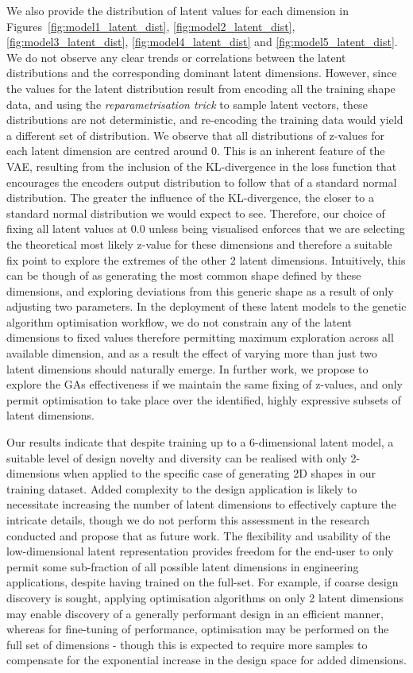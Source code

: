 \documentclass{article}
\begin{document}
We also provide the distribution of latent values for each dimension in Figures~\ref{fig:model1_latent_dist}, \ref{fig:model2_latent_dist}, \ref{fig:model3_latent_dist}, \ref{fig:model4_latent_dist} and \ref{fig:model5_latent_dist}. We do not observe any clear trends or correlations between the latent distributions and the corresponding dominant latent dimensions. However, since the values for the latent distribution result from encoding all the training shape data, and using the \textit{reparametrisation trick} to sample latent vectors, these distributions are not deterministic, and re-encoding the training data would yield a different set of distribution. We observe that all distributions of z-values for each latent dimension are centred around 0. This is an inherent feature of the VAE, resulting from the inclusion of the KL-divergence in the loss function that encourages the encoders output distribution to follow that of a standard normal distribution. The greater the influence of the KL-divergence, the closer to a standard normal distribution we would expect to see. Therefore, our choice of fixing all latent values at 0.0 unless being visualised enforces that we are selecting the theoretical most likely z-value for these dimensions and therefore a suitable fix point to explore the extremes of the other 2 latent dimensions. Intuitively, this can be though of as generating the most common shape defined by these dimensions, and exploring deviations from this generic shape as a result of only adjusting two parameters. In the deployment of these latent models to the genetic algorithm optimisation workflow, we do not constrain any of the latent dimensions to fixed values therefore permitting maximum exploration across all available dimension, and as a result the effect of varying more than just two latent dimensions should naturally emerge. In further work, we propose to explore the GAs effectiveness if we maintain the same fixing of z-values, and only permit optimisation to take place over the identified, highly expressive subsets of latent dimensions.

Our results indicate that despite training up to a 6-dimensional latent model, a suitable level of design novelty and diversity can be realised with only 2-dimensions when applied to the specific case of generating 2D shapes in our training dataset. Added complexity to the design application is likely to necessitate increasing the number of latent dimensions to effectively capture the intricate details, though we do not perform this assessment in the research conducted and propose that as future work. The flexibility and usability of the low-dimensional latent representation provides freedom for the end-user to only permit some sub-fraction of all possible latent dimensions in engineering applications, despite having trained on the full-set. For example, if coarse design discovery is sought, applying optimisation algorithms on only 2 latent dimensions may enable discovery of a generally performant design in an efficient manner, whereas for fine-tuning of performance, optimisation may be performed on the full set of dimensions - though this is expected to require more samples to compensate for the exponential increase in the design space for added dimensions.
\end{document}
